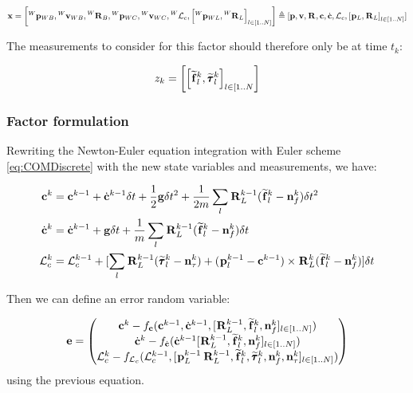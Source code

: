 \documentclass[11pt]{article}
\newcommand{\Rot}[2]{\prescript{#1}{}{\bfR}_{#2}}
\newcommand{\noise}{\bfn}
\newcommand{\posi}[2]{\prescript{#1}{}{\bfp}_{#2}}
\newcommand{\vel}[2]{\prescript{#1}{}{\bfv}_{#2}}
\newcommand{\forcem}[2]{\prescript{#1}{}{\widetilde{\bff}}_{#2}}
\newcommand{\torquem}[2]{\prescript{#1}{}{\widetilde{\pmb{\tau}}}_{#2}}
\newcommand{\AM}{\mathcal{L}}
\newcommand{\COM}{\bfc}
\newcommand{\COMd}{\dot{\bfc}}
\begin{document}
\begin{equation*}
\bfx = \left[\posi{W}{WB}, \vel{W}{WB}, \Rot{W}{B}, \posi{W}{WC}, \vel{W}{WC}, \prescript{W}{}{\AM}_{c}, \left[\posi{W}{WL}, \Rot{W}{L}\right]_{l \in [1..N]} \right] 
\triangleq 
[\bfp, \bfv, \Rot{}{}, \COM, \COMd, \AM_c, \left[\posi{}{L}, \Rot{}{L}\right]_{l \in [1..N]} ] 
\end{equation*}

The measurements to consider for this factor should therefore only be at time $t_k$:

\begin{equation}
z_k = \left[\left[\forcem{}{l}^k, \torquem{}{l}^k \right]_{l \in [1..N} \right]
\end{equation}


\subsubsection{Factor formulation}
Rewriting the Newton-Euler equation integration with Euler scheme \ref{eq:COMDiscrete} with the new state variables and measurements, we have:

\begin{equation}
\begin{split}
\COM^{k} &= \COM^{k-1} + \COMd^{k-1} \delta t 
+ \frac{1}{2} \bfg \delta t^2 + \frac{1}{2m} \sum_l \Rot{}{L}^{k-1} (\forcem{}{l}^{k} - \noise_f^{k}) \delta t^2
\\
\COMd^{k}&= \COMd^{k-1} + \bfg \delta t + \frac{1}{m} \sum_l \Rot{}{L}^{k-1} (\forcem{}{l}^{k} - \noise_f^{k}) \delta t 
\\
\AM_c^{k} &= \AM_c^{k-1} +  [ 
\sum_l \Rot{}{L}^{k-1}(\torquem{}{l}^{k} - \noise_{\tau}^{k}) + (\posi{}{l}^{k-1} - \COM^{k-1}) \times \Rot{}{L}^{k}(\forcem{}{l}^{k} - \noise_f^{k}) 
] \delta t
\end{split}
\label{eq:COMDiscreteFeet}
\end{equation}

Then we can define an error random variable:

\begin{equation}
	\bfe =
	\begin{pmatrix}
	\COM^k - f_{\COM}(\COM^{k-1}, \COMd^{k-1}, [\Rot{}{L}^{k-1}, \forcem{}{l}^k, \noise_f^k]_{l \in [1..N]})
	\\
	\COMd^k - f_{\COMd}(\COMd^{k-1} [\Rot{}{L}^{k-1}, \forcem{}{l}^k, \noise_f^k]_{l \in [1..N]})
	\\
	\AM_c^k - f_{\AM_c}(\AM_c^{k-1}, [\posi{}{L}^{k-1} \Rot{}{L}^{k-1}, \forcem{}{l}^k, \torquem{}{l}^k, \noise_f^k, \noise_{\tau}^k]_{l \in [1..N]})	
	\end{pmatrix}
\end{equation}
using the previous equation.
\end{document}
